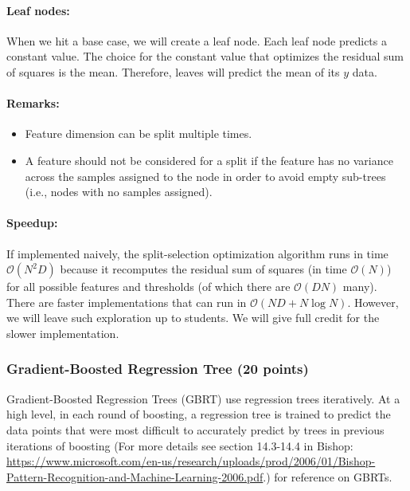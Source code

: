 \documentclass[11pt]{article}
\begin{document}
\paragraph{Leaf nodes: }
When we hit a base case, we will create a leaf node.  Each leaf node predicts a
constant value.  The choice for the constant value that optimizes the residual
sum of squares is the mean.  Therefore, leaves will predict the mean of its
$y$ data.


\paragraph{Remarks:}

\begin{itemize}
\item Feature dimension can be split multiple times.
\item A feature should not be considered for a split if the feature has no
  variance across the samples assigned to the node in order to avoid empty
  sub-trees (i.e., nodes with no samples assigned).
\end{itemize}


\paragraph{Speedup:}
If implemented naively, the split-selection optimization algorithm runs in time
$\mathcal{O}(N^2 D)$ because it recomputes the residual sum of squares (in time
$\mathcal{O}(N)$) for all possible features and thresholds (of which there are
$\mathcal{O}(D N)$ many). There are faster implementations that can run in
$\mathcal{O}(N D + N \log N)$.  However, we will leave such exploration up to
students.  We will give full credit for the slower implementation.

\newpage
\subsubsection{Gradient-Boosted Regression Tree (20 points)}
Gradient-Boosted Regression Trees (GBRT) use regression trees iteratively. At a high level, in each round of boosting, a regression tree is trained to predict the data points that were most difficult to accurately predict by trees in previous iterations of boosting (For more details see section 14.3-14.4 in Bishop: \url{https://www.microsoft.com/en-us/research/uploads/prod/2006/01/Bishop-Pattern-Recognition-and-Machine-Learning-2006.pdf}.) for reference on GBRTs.
\end{document}
